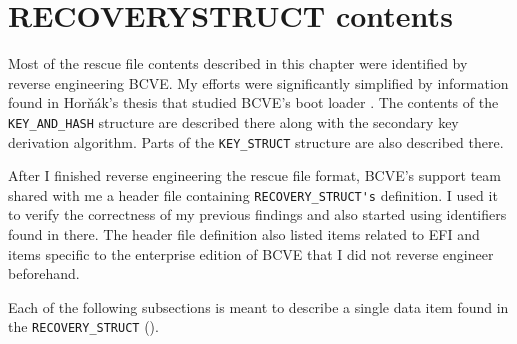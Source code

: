 \documentclass[thesis=B,english]{FITthesis}[2012/10/20]
\begin{document}
	\newcommand{\TextUnderscore}{\rule{.5em}{0.5pt}}
	\section{RECOVERY\textunderscore{}STRUCT contents}
	
	Most of the rescue file contents described in this chapter were identified by reverse engineering BCVE. My efforts were significantly simplified by information found in Hor{\v n}{\' a}k's thesis that studied BCVE's boot loader \cite{hornak}. The contents of the \verb|KEY_AND_HASH| structure are described there along with the secondary key derivation algorithm. Parts of the \verb|KEY_STRUCT| structure are also described there.
	
	After I finished reverse engineering the rescue file format, BCVE's support team shared with me a header file containing \verb|RECOVERY_STRUCT's| definition. I used it to verify the correctness of my previous findings and also started using identifiers found in there. The header file definition also listed items related to EFI and items specific to the enterprise edition of BCVE that I did not reverse engineer beforehand. 
	
	Each of the following subsections is meant to describe a single data item found in the \verb|RECOVERY_STRUCT| ().
	
\end{document}

